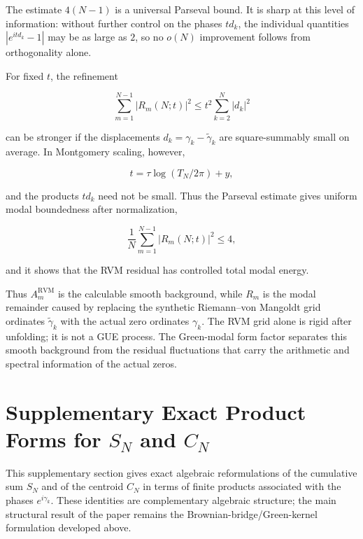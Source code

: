 \documentclass[11pt]{amsart}
\numberwithin{equation}{section}
\theoremstyle{plain}
\theoremstyle{definition}
\theoremstyle{remark}
\begin{document}
The estimate \(4(N-1)\) is a universal Parseval bound. It is sharp at
this level of information: without further control on the phases
\(td_k\), the individual quantities \(|e^{itd_k}-1|\) may be as large as
\(2\), so no \(o(N)\) improvement follows from orthogonality alone.

For fixed \(t\), the refinement

\begin{equation}
\sum_{m=1}^{N-1}|R_m(N;t)|^2
\le
t^2\sum_{k=2}^{N}|d_k|^2
\end{equation}

can be stronger if the displacements
\(d_k=\gamma_k-\widetilde\gamma_k\) are square-summably small on average.
In Montgomery scaling, however,

\begin{equation}
t=\tau\log(T_N/2\pi)+y,
\end{equation}

and the products \(td_k\) need not be small. Thus the Parseval estimate
gives uniform modal boundedness after normalization,

\begin{equation}
\frac1N\sum_{m=1}^{N-1}|R_m(N;t)|^2\le4,
\label{eq:rvm_residual_normalized_bound}
\end{equation}

and it shows that the RVM residual has controlled total modal energy.

Thus \(A_m^{\mathrm{RVM}}\) is the calculable smooth background, while
\(R_m\) is the modal remainder caused by replacing the synthetic
Riemann--von Mangoldt grid ordinates \(\widetilde\gamma_k\) with the
actual zero ordinates \(\gamma_k\). The RVM grid alone is rigid after
unfolding; it is not a GUE process. The Green-modal form factor
separates this smooth background from the residual fluctuations that
carry the arithmetic and spectral information of the actual zeros.

\section[Supplementary Exact Product Forms for SN and CN]{Supplementary Exact Product Forms for \texorpdfstring{\(S_N\)}{SN} and \texorpdfstring{\(C_N\)}{CN}}
\label{sec:product_forms_SN_CN}

This supplementary section gives exact algebraic reformulations of the
cumulative sum \(S_N\) and of the centroid \(C_N\) in terms of finite
products associated with the phases \(e^{i\gamma_k}\). These identities
are complementary algebraic structure; the main structural result of the
paper remains the Brownian-bridge/Green-kernel formulation developed
above.
\end{document}
